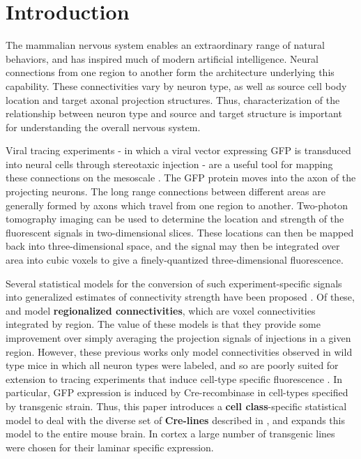 \section{Introduction}
 
The mammalian nervous system enables an extraordinary range of natural behaviors, and has inspired much of modern artificial intelligence.
Neural connections from one region to another form the architecture underlying this capability.
These connectivities vary by neuron type, as well as source cell body location and target axonal projection structures.
Thus, characterization of the relationship between neuron type and source and target structure is important for understanding the overall nervous system.

Viral tracing experiments - in which a viral vector expressing GFP is transduced into neural cells through stereotaxic injection - are a useful tool for mapping these connections on the mesoscale \citep{Chamberlin1998-hi,Harris2012-fw, Daigle2018-gd}.
The GFP protein moves into the axon of the projecting neurons. The long range connections between different areas are generally formed by axons which travel from one region to another. 
Two-photon tomography imaging can be used to determine the location and strength of the fluorescent signals in two-dimensional slices.
These locations can then be mapped back into three-dimensional space, and the signal may then be integrated over area into cubic voxels to give a finely-quantized three-dimensional fluorescence.

Several statistical models for the conversion of such experiment-specific signals into generalized estimates of connectivity strength have been proposed \citep{Oh2014-kh, Harris2016-fn, Gamanut2018-sd, Knox2019-ot}.
Of these, \citet{Oh2014-kh} and \citet{Knox2019-ot} model \textbf{regionalized connectivities}, which are voxel connectivities integrated by region.
The value of these models is that they provide some improvement over simply averaging the projection signals of injections in a given region.
However, these previous works only model connectivities observed in wild type mice in which all neuron types were labeled, and so are poorly suited for extension to tracing experiments that induce cell-type specific fluorescence \citep{Harris2019-mr}.
In particular, GFP expression is induced by Cre-recombinase in cell-types specified by transgenic strain.
Thus, this paper introduces a \textbf{cell class}-specific statistical model to deal with the diverse set of \textbf{Cre-lines} described in \citet{Harris2019-mr}, and expands this model to the entire mouse brain. In cortex a large number of transgenic lines were chosen for their laminar specific expression.

